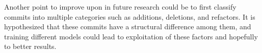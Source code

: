 Another point to improve upon in future research could be to first classify commits into multiple categories such as additions, deletions, and refactors. It is hypothesized that these commits have a structural difference among them, and training different models could lead to exploitation of these factors and hopefully to better results.

